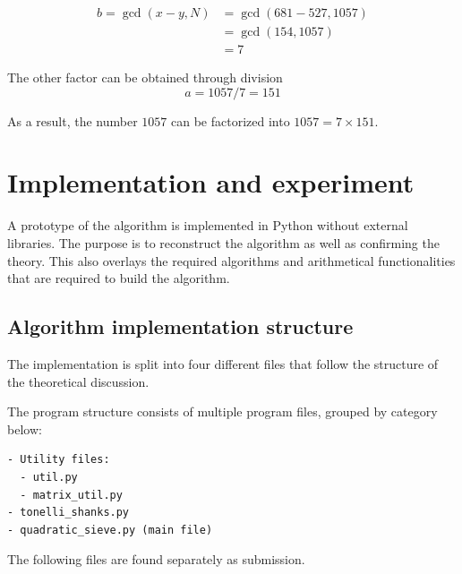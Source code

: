 \documentclass[11pt,a4paper]{article}
\begin{document}
\[
\begin{aligned}
b = \gcd(x-y,N)&=\gcd(681-527,1057)\\
&=\gcd(154,1057)\\
&=7
\end{aligned}
\]

The other factor can be obtained through division
\[
a = 1057/7 = 151
\]

As a result, the number $1057$ can be factorized into $1057 = 7 \times 151$.

\section*{Implementation and experiment}

A prototype of the algorithm is implemented in Python without external libraries. The purpose is to reconstruct the algorithm as well as confirming the theory. This also overlays the required algorithms and arithmetical functionalities that are required to build the algorithm.

\subsection*{Algorithm implementation structure}

The implementation is split into four different files that follow the structure of the theoretical discussion.

The program structure consists of multiple program files, grouped by category below:
\begin{lstlisting}
- Utility files:
  - util.py
  - matrix_util.py
- tonelli_shanks.py
- quadratic_sieve.py (main file)
\end{lstlisting}
The following files are found separately as submission.
\end{document}

